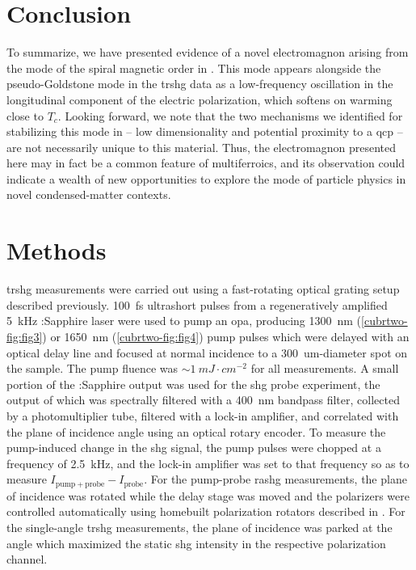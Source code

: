 \section{Conclusion}
To summarize, we have presented evidence of a novel electromagnon arising from the \higgs mode of the spiral magnetic order in .
This mode appears alongside the pseudo-Goldstone mode in the \gls{trshg} data as a low-frequency oscillation in the longitudinal component of the electric polarization, which softens on warming close to $T_c$.
Looking forward, we note that the two mechanisms we identified for stabilizing this mode in  -- low dimensionality and potential proximity to a \gls{qcp} -- are not necessarily unique to this material.
Thus, the \higgs electromagnon presented here may in fact be a common feature of \oned multiferroics, and its observation could indicate a wealth of new opportunities to explore the \higgs mode of particle physics in novel condensed-matter contexts.

\section{Methods}\label{cubrtwo-sec:methods}
\Gls{trshg} measurements were carried out using a fast-rotating optical grating setup described previously\citep{fichera_second_2020,harter_high-speed_2015,torchinsky_low_2014}.
\qty{100}{fs} ultrashort pulses from a regeneratively amplified \qty{5}{kHz} :Sapphire laser were used to pump an \gls{opa}, producing \qty{1300}{nm} (\cref{cubrtwo-fig:fig3}) or \qty{1650}{nm} (\cref{cubrtwo-fig:fig4}) pump pulses which were delayed with an optical delay line and focused at normal incidence to a \qty{300}{um}-diameter spot on the sample.
The pump fluence was $\sim \qty{1}{mJ\cdot cm^{-2}}$ for all measurements.
A small portion of the :Sapphire output was used for the \gls{shg} probe experiment, the output of which was spectrally filtered with a \qty{400}{nm} bandpass filter, collected by a photomultiplier tube, filtered with a lock-in amplifier, and correlated with the plane of incidence angle using an optical rotary encoder.
To measure the pump-induced change in the \gls{shg} signal, the pump pulses were chopped at a frequency of \qty{2.5}{kHz}, and the lock-in amplifier was set to that frequency so as to measure $I_{\mathrm{pump}+\mathrm{probe}}-I_\mathrm{probe}$.
For the pump-probe \gls{rashg} measurements, the plane of incidence was rotated while the delay stage was moved and the polarizers were controlled automatically using homebuilt polarization rotators described in \citet{morey_automated_2024}.
For the single-angle \gls{trshg} measurements, the plane of incidence was parked at the angle which maximized the static \gls{shg} intensity in the respective polarization channel.

